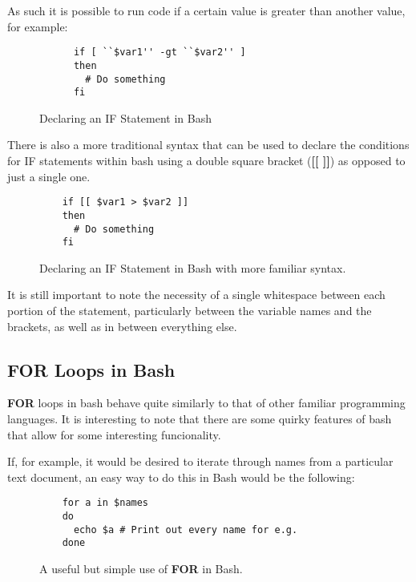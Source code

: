 \documentclass{article}
\begin{document}
As such it is possible to run code if a certain value is greater than another value, for example:

\begin{figure}[h]
  \label{bash2}
    \lstset{language=Bash}
    \begin{lstlisting}
      if [ ``$var1'' -gt ``$var2'' ]
      then
        # Do something
      fi
    \end{lstlisting}
    \caption{Declaring an IF Statement in Bash}
\end{figure}

There is also a more traditional syntax that can be used to declare the conditions for IF statements within bash using a double square bracket (\textbf{[[ ]]}) as
opposed to just a single one.

\begin{figure}[h]
  \label{bash3}
  \lstset{language=bash}
  \begin{lstlisting}
    if [[ $var1 > $var2 ]]
    then
      # Do something
    fi
  \end{lstlisting}
  \caption{Declaring an IF Statement in Bash with more familiar syntax.}
\end{figure}

It is still important to note the necessity of a single whitespace between each portion of the statement, particularly between the variable names and the brackets, as well as in between everything else.

\subsection{FOR Loops in Bash}

\textbf{FOR} loops in bash behave quite similarly to that of other familiar programming languages. It is interesting to note that there are some quirky features of bash that allow for some interesting
funcionality.

If, for example, it would be desired to iterate through names from a particular text document, an easy way to do this in Bash would be the following:

\begin{figure}[h]
  \label{bash4}
  \lstset{language=Bash}
  \begin{lstlisting}
    for a in $names
    do
      echo $a # Print out every name for e.g.
    done
  \end{lstlisting}
  \caption{A useful but simple use of \textbf{FOR} in Bash.}
\end{figure}
\end{document}
